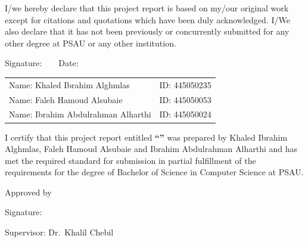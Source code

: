\begin{titlepage}
\vspace*{2.5cm}
\begin{center}
\titleblock{1.8cm}
\end{center}
\end{titlepage}

\setcounter{page}{2}

I/we hereby declare that this project report is based on my/our original
work except for citations and quotations which have been duly acknowledged.
I/We also declare that it has not been previously or concurrently submitted
for any other degree at PSAU or any other institution.

\vspace{1.5cm}
\noindent Signature:\ \dotfill\ \ \ Date:\ \makebox[5cm]{\dotfill}

\vspace{1cm}
\noindent
\begin{tabular}{@{}p{}l@{}}
Name: Khaled Ibrahim Alghmlas      & ID: 445050235 \\[0.4em]
Name: Faleh Hamoud Alsubaie        & ID: 445050053 \\[0.4em]
Name: Ibrahim Abdulrahman Alharthi & ID: 445050024 \\
\end{tabular}


I certify that this project report entitled \textbf{``\projecttitle''} was
prepared by Khaled Ibrahim Alghmlas, Faleh Hamoud Alsubaie and Ibrahim
Abdulrahman Alharthi and has met the required standard for submission in
partial fulfillment of the requirements for the degree of Bachelor of Science
in Computer Science at PSAU.

\vspace{1.2cm}
Approved by

\vspace{2cm}
\noindent Signature:\ \makebox[7cm]{\dotfill}

\noindent Supervisor: Dr.\ Khalil Chebil


